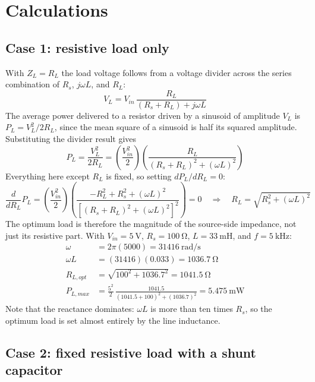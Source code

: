 \documentclass[11pt]{article}
\begin{document}
\section*{Calculations}

\subsection*{Case 1: resistive load only}

With $Z_L = R_L$ the load voltage follows from a voltage divider across the
series combination of $R_s$, $j\omega L$, and $R_L$:
\[
    V_L = V_{in}\,\frac{R_L}{(R_s + R_L) + j\omega L}
\]
The average power delivered to a resistor driven by a sinusoid of amplitude
$V_L$ is $P_L = V_L^2/2R_L$, since the mean square of a sinusoid is half its
squared amplitude. Substituting the divider result gives
\[
    P_L = \frac{V_L^2}{2R_L}
        = \left(\frac{V_{in}^2}{2}\right)
          \left(\frac{R_L}{(R_s + R_L)^2 + (\omega L)^2}\right)
\]
Everything here except $R_L$ is fixed, so setting $dP_L/dR_L = 0$:
\[
    \frac{d}{dR_L}P_L
      = \left(\frac{V_{in}^2}{2}\right)
        \left(\frac{-R_L^2 + R_s^2 + (\omega L)^2}
                   {\left[(R_s + R_L)^2 + (\omega L)^2\right]^2}\right) = 0
    \quad\Longrightarrow\quad
    R_L = \sqrt{R_s^2 + (\omega L)^2}
\]
The optimum load is therefore the magnitude of the source-side impedance, not
just its resistive part. With $V_{in} = \SI{5}{\volt}$,
$R_s = \SI{100}{\ohm}$, $L = \SI{33}{\milli\henry}$, and
$f = \SI{5}{\kilo\hertz}$:
\begin{align*}
    \omega    &= 2\pi(5000) = \SI{31416}{\radian\per\second} \\
    \omega L  &= (31416)(0.033) = \SI{1036.7}{\ohm} \\
    R_{L,opt} &= \sqrt{100^2 + 1036.7^2} = \SI{1041.5}{\ohm} \\
    P_{L,max} &= \frac{5^2}{2}\,\frac{1041.5}{(1041.5+100)^2 + (1036.7)^2}
               = \SI{5.475}{\milli\watt}
\end{align*}
Note that the reactance dominates: $\omega L$ is more than ten times $R_s$, so
the optimum load is set almost entirely by the line inductance.

\subsection*{Case 2: fixed resistive load with a shunt capacitor}
\end{document}
